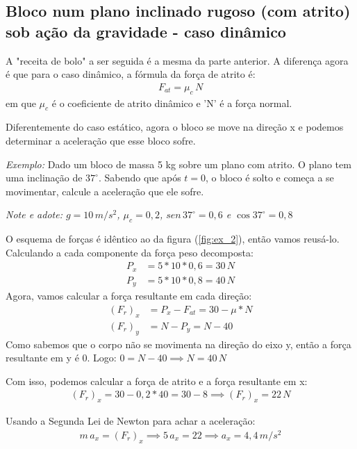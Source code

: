 \documentclass[12pt]{extarticle}
\newcommand{\<}{\langle}
\renewcommand{\>}{\rangle}
\theoremstyle{definition}
\begin{document}
\subsection{Bloco num plano inclinado rugoso (com atrito) sob ação da gravidade - caso dinâmico}

A "receita de bolo" a ser seguida é a mesma da parte anterior. A diferença agora é que para o caso dinâmico, a fórmula da força de atrito é:
\begin{align*}
    F_{at}=\mu_c\,N
\end{align*}
\noindent em que $\mu_c$ é o coeficiente de atrito dinâmico e 'N' é a força normal.

Diferentemente do caso estático, agora o bloco se move na direção x e podemos determinar a aceleração que esse bloco sofre.

\textit{Exemplo:} Dado um bloco de massa 5 kg sobre um plano com atrito. O plano tem uma inclinação de $37^\circ$. Sabendo que após $t=0$, o bloco é solto e começa a se movimentar, calcule a aceleração que ele sofre.

\textit{Note e adote: $g=10\,m/s^2$, $\mu_c=0,2$, $sen\,37^\circ = 0,6$ e $\cos37^\circ =0,8$}

O esquema de forças é idêntico ao da figura (\ref{fig:ex_2}), então vamos reusá-lo. Calculando a cada componente da força peso decomposta:
\begin{align*}
    P_x &= 5*10*0,6 = 30\,N\\
    P_y &= 5*10*0,8 = 40\,N
\end{align*}
Agora, vamos calcular a força resultante em cada direção:
\begin{align*}
    (F_r)_x &= P_x - F_{at} = 30 - \mu*N \\
    (F_r)_y &= N - P_y = N - 40
\end{align*}
Como sabemos que o corpo não se movimenta na direção do eixo y, então a força resultante em y é 0. Logo: $0 = N -40 \implies N =40\,N$

Com isso, podemos calcular a força de atrito e a força resultante em x:
\begin{align*}
    (F_r)_x = 30 -0,2*40 = 30 -8 \implies (F_r)_x = 22\,N
\end{align*}

Usando a Segunda Lei de Newton para achar a aceleração:
\begin{align*}
    m\,a_x = (F_r)_x \implies 5\,a_x = 22 \implies a_x = 4,4\,m/s^2
\end{align*}
\end{document}
